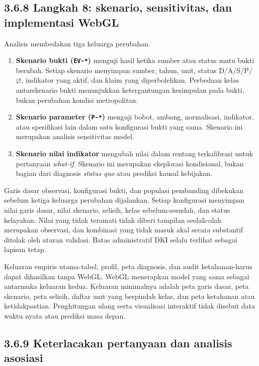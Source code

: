 \documentclass[
  indonesian,
  11pt,
  a4paper,
  oneside,
  openany]{report}
\providecommand{\tightlist}{%
  \setlength{\itemsep}{0pt}\setlength{\parskip}{0pt}}
\begin{document}
\subsection{3.6.8 Langkah 8: skenario, sensitivitas, dan implementasi
WebGL}\label{langkah-8-skenario-sensitivitas-dan-implementasi-webgl}

Analisis membedakan tiga keluarga perubahan.

\begin{enumerate}
\def\labelenumi{\arabic{enumi}.}
\tightlist
\item
  \textbf{Skenario bukti (\texttt{EV-*})} menguji hasil ketika sumber
  atau status mutu bukti berubah. Setiap skenario menyimpan sumber,
  tahun, unit, status D/A/S/P/\(\varnothing\), indikator yang aktif, dan
  klaim yang diperbolehkan. Perbedaan kelas antarskenario bukti
  menunjukkan ketergantungan kesimpulan pada bukti, bukan perubahan
  kondisi metropolitan.
\item
  \textbf{Skenario parameter (\texttt{P-*})} menguji bobot, ambang,
  normalisasi, indikator, atau spesifikasi lain dalam satu konfigurasi
  bukti yang sama. Skenario ini merupakan analisis sensitivitas model.
\item
  \textbf{Skenario nilai indikator} mengubah nilai dalam rentang
  terkalibrasi untuk pertanyaan \emph{what-if}. Skenario ini merupakan
  eksplorasi kondisional, bukan bagian dari diagnosis \emph{status quo}
  atau prediksi kausal kebijakan.
\end{enumerate}

Garis dasar observasi, konfigurasi bukti, dan populasi pembanding
dibekukan sebelum ketiga keluarga perubahan dijalankan. Setiap
konfigurasi menyimpan nilai garis dasar, nilai skenario, selisih, kelas
sebelum-sesudah, dan status kelayakan. Nilai yang tidak teramati tidak
diberi tampilan seolah-olah merupakan observasi, dan kombinasi yang
tidak masuk akal secara substantif ditolak oleh aturan validasi. Batas
administratif DKI selalu terlihat sebagai lapisan tetap.

Keluaran empiris utama-tabel, profil, peta diagnosis, dan audit
ketahanan-harus dapat dihasilkan tanpa WebGL. WebGL menerapkan model
yang sama sebagai antarmuka keluaran kedua. Keluaran minimalnya adalah
peta garis dasar, peta skenario, peta selisih, daftar unit yang
berpindah kelas, dan peta ketahanan atau ketidakpastian. Penghitungan
ulang serta visualisasi interaktif tidak disebut data waktu nyata atau
prediksi masa depan.

\subsection{3.6.9 Keterlacakan pertanyaan dan analisis
asosiasi}\label{keterlacakan-pertanyaan-dan-analisis-asosiasi}
\end{document}
